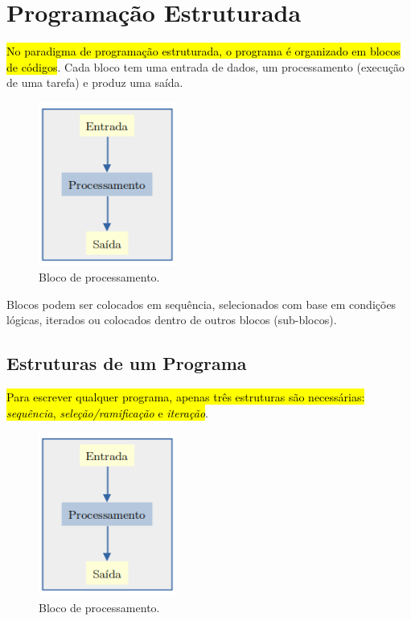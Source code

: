 
\chapter{Programação Estruturada}\label{cap_progest}
\thispagestyle{fancy}

\hl{No paradigma de programação estruturada, o programa é organizado em blocos de códigos}. Cada bloco tem uma entrada de dados, um processamento (execução de uma tarefa) e produz uma saída.

\begin{figure}[H]
  \centering
  \includegraphics[width=0.4\textwidth]{./cap_progest/dados/fig_fg_bloco/fig}
  \caption{Bloco de processamento.}
  \label{cap_progest:fig:fg_bloco}
\end{figure}

Blocos podem ser colocados em sequência, selecionados com base em condições lógicas, iterados ou colocados dentro de outros blocos (sub-blocos).

\section{Estruturas de um Programa}\label{cap_progest_sec_est}

\hl{Para escrever qualquer programa, apenas três estruturas são necessárias: \emph{sequência}, \emph{seleção/ramificação} e \emph{iteração}}.

\begin{figure}[H]
  \centering
  \includegraphics[width=0.4\textwidth]{./cap_progest/dados/fig_fg_bloco/fig}
  \caption{Bloco de processamento.}
  \label{cap_progest:fig:fg_bloco}
\end{figure}


